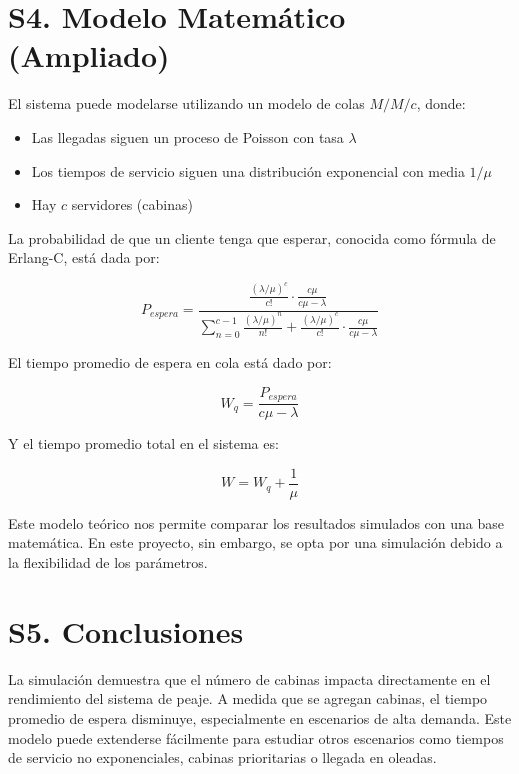\documentclass[12pt]{article}
\begin{document}
\section*{S4. Modelo Matemático (Ampliado)}

El sistema puede modelarse utilizando un modelo de colas $M/M/c$, donde:

\begin{itemize}
    \item Las llegadas siguen un proceso de Poisson con tasa $\lambda$
    \item Los tiempos de servicio siguen una distribución exponencial con media $1/\mu$
    \item Hay $c$ servidores (cabinas)
\end{itemize}

La probabilidad de que un cliente tenga que esperar, conocida como fórmula de Erlang-C, está dada por:

\[
P_{espera} = \frac{ \frac{ (\lambda/\mu)^c }{c!} \cdot \frac{c\mu}{c\mu - \lambda} }{ \sum_{n=0}^{c-1} \frac{ (\lambda/\mu)^n }{n!} + \frac{ (\lambda/\mu)^c }{c!} \cdot \frac{c\mu}{c\mu - \lambda} }
\]

El tiempo promedio de espera en cola está dado por:

\[
W_q = \frac{P_{espera}}{c\mu - \lambda}
\]

Y el tiempo promedio total en el sistema es:

\[
W = W_q + \frac{1}{\mu}
\]

Este modelo teórico nos permite comparar los resultados simulados con una base matemática. En este proyecto, sin embargo, se opta por una simulación debido a la flexibilidad de los parámetros.

\section*{S5. Conclusiones}
La simulación demuestra que el número de cabinas impacta directamente en el rendimiento del sistema de peaje. A medida que se agregan cabinas, el tiempo promedio de espera disminuye, especialmente en escenarios de alta demanda. Este modelo puede extenderse fácilmente para estudiar otros escenarios como tiempos de servicio no exponenciales, cabinas prioritarias o llegada en oleadas.
\end{document}
